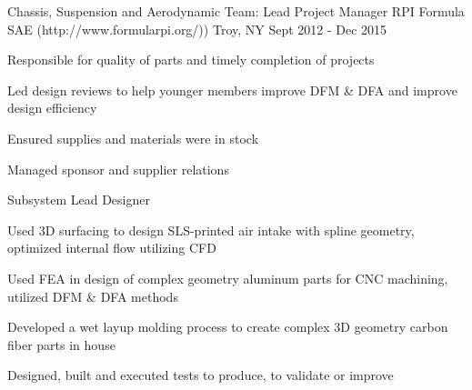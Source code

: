 

\begin{cventries}

  \cventry
    {Chassis, Suspension and Aerodynamic Team: Lead Project Manager} %
    {RPI Formula SAE ({\tiny http://www.formularpi.org/)})} %
    {Troy, NY} %
    {Sept 2012 - Dec 2015} %
    {
      \begin{cvitems} %
        \item {Responsible for quality of parts and timely completion of projects}
          \item {Led design reviews to help younger members improve DFM & DFA and improve design efficiency}
          \item {Ensured supplies and materials were in stock}
          \item {Managed sponsor and supplier relations}
        \item{Subsystem Lead Designer}
          \item {Used 3D surfacing to design SLS-printed air intake with spline geometry, optimized internal flow utilizing CFD}
          \item {Used FEA in design of complex geometry aluminum parts for CNC machining, utilized DFM & DFA methods}
          \item {Developed a wet layup molding process to create complex 3D geometry carbon fiber parts in house}
          \item {Designed, built and executed tests to produce, to validate or improve}
      \end{cvitems}
    }



\end{cventries}
